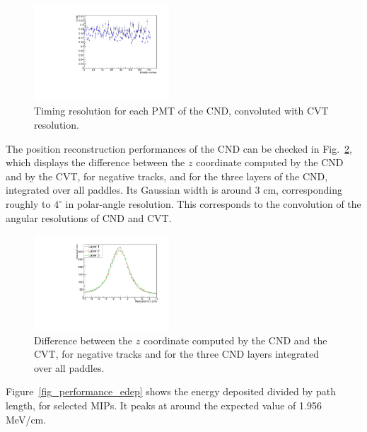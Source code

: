 \begin{figure}[htb]  
\begin{center}
\includegraphics[width=0.45\textwidth]{Figure/VTsigma.pdf}
\caption {Timing resolution for each PMT of the CND, convoluted with CVT resolution.}
\label{fig_performance_vt_sigma_allpaddles}
\end{center}
\end{figure}

The position reconstruction performances of the CND can be checked in Fig.~\ref{fig_performance_deltaz}, which displays the difference between the $z$ coordinate computed by the CND and by the CVT, for negative tracks, and for the three layers of the CND, integrated over all paddles. Its Gaussian width is around 3 cm, corresponding roughly to $4^{\circ}$ in polar-angle resolution. This corresponds to the convolution of the angular resolutions of CND and CVT. 

\begin{figure}[htb]  
\begin{center}
\includegraphics[width=0.45\textwidth]{Figure/canZ.pdf}
\caption {Difference between the $z$ coordinate computed by the CND and the CVT, for negative tracks and for the three CND layers integrated over all paddles. }
\label{fig_performance_deltaz}
\end{center}
\end{figure}

Figure~\ref{fig_performance_edep} shows the energy deposited divided by path length, for selected MIPs. It peaks at around the expected value of 1.956 MeV/cm.

